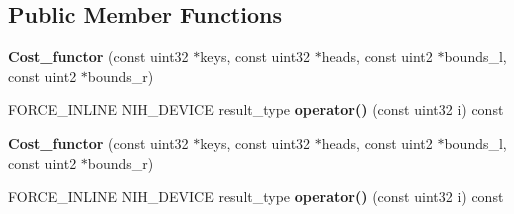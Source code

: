 \subsection*{\-Public \-Member \-Functions}
\begin{DoxyCompactItemize}
\item 
\hypertarget{structnih_1_1cuda_1_1sah_1_1_cost__functor_af05e274f103780781c5f0dfdc869e60c}{
{\bfseries \-Cost\-\_\-functor} (const uint32 $\ast$keys, const uint32 $\ast$heads, const uint2 $\ast$bounds\-\_\-l, const uint2 $\ast$bounds\-\_\-r)}
\label{structnih_1_1cuda_1_1sah_1_1_cost__functor_af05e274f103780781c5f0dfdc869e60c}

\item 
\hypertarget{structnih_1_1cuda_1_1sah_1_1_cost__functor_ae78f492135cccd9860712017d94bb261}{
\-F\-O\-R\-C\-E\-\_\-\-I\-N\-L\-I\-N\-E \-N\-I\-H\-\_\-\-D\-E\-V\-I\-C\-E result\-\_\-type {\bfseries operator()} (const uint32 i) const }
\label{structnih_1_1cuda_1_1sah_1_1_cost__functor_ae78f492135cccd9860712017d94bb261}

\item 
\hypertarget{structnih_1_1cuda_1_1sah_1_1_cost__functor_af05e274f103780781c5f0dfdc869e60c}{
{\bfseries \-Cost\-\_\-functor} (const uint32 $\ast$keys, const uint32 $\ast$heads, const uint2 $\ast$bounds\-\_\-l, const uint2 $\ast$bounds\-\_\-r)}
\label{structnih_1_1cuda_1_1sah_1_1_cost__functor_af05e274f103780781c5f0dfdc869e60c}

\item 
\hypertarget{structnih_1_1cuda_1_1sah_1_1_cost__functor_ae78f492135cccd9860712017d94bb261}{
\-F\-O\-R\-C\-E\-\_\-\-I\-N\-L\-I\-N\-E \-N\-I\-H\-\_\-\-D\-E\-V\-I\-C\-E result\-\_\-type {\bfseries operator()} (const uint32 i) const }
\label{structnih_1_1cuda_1_1sah_1_1_cost__functor_ae78f492135cccd9860712017d94bb261}

\end{DoxyCompactItemize}
